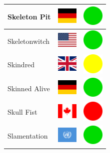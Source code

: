 \documentclass[12pt, a4paper, twoside]{report}
\begin{document}
\begin{center}
\begin{longtable}{|p{5cm}|p{2cm}|p{2cm}|}
Skeleton Pit & \includegraphics[width=1cm]{4x3/de} & \includegraphics[width=1cm]{likes/y} \\ \hline
Skeletonwitch & \includegraphics[width=1cm]{4x3/us} & \includegraphics[width=1cm]{likes/y} \\ \hline
Skindred & \includegraphics[width=1cm]{4x3/gb} & \includegraphics[width=1cm]{likes/m} \\ \hline
Skinned Alive & \includegraphics[width=1cm]{4x3/de} & \includegraphics[width=1cm]{likes/y} \\ \hline
Skull Fist & \includegraphics[width=1cm]{4x3/ca} & \includegraphics[width=1cm]{likes/n} \\ \hline
Slamentation & \includegraphics[width=1cm]{4x3/un} & \includegraphics[width=1cm]{likes/y} \\ \hline

\end{longtable}
\end{center}
\end{document}
